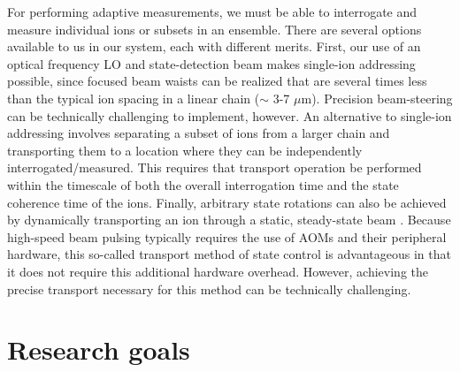 For performing adaptive measurements, we must be able to interrogate and measure individual ions or subsets in an ensemble. There are several options available to us in our system, each with different merits. First, our use of an optical frequency LO and state-detection beam makes single-ion addressing possible, since focused beam waists can be realized that are several times less than the typical ion spacing in a linear chain ($\sim$ 3-7 $\mu$m). Precision beam-steering can be technically challenging to implement, however. An alternative to single-ion addressing involves separating a subset of ions from a larger chain and transporting them to a location where they can be independently interrogated/measured. This requires that transport operation be performed within the timescale of both the overall interrogation time and the state coherence time of the ions. Finally, arbitrary state rotations can also be achieved by dynamically transporting an ion through a static, steady-state beam \cite{TransGateTh,TransGateExp}. Because high-speed beam pulsing typically requires the use of AOMs and their peripheral hardware, this so-called transport method of state control is advantageous in that it does not require this additional hardware overhead. However, achieving the precise transport necessary for this method can be technically challenging. 





\section{Research goals}




